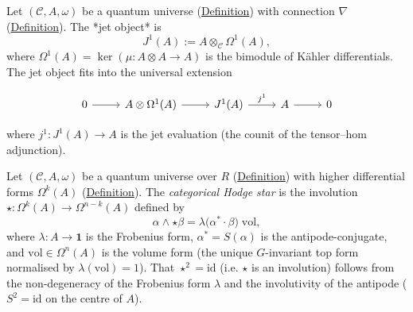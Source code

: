 \begin{definition}
  \label{def:categorical-jet}
Let $(\mathcal{C}, A, \omega)$ be a quantum universe
(\hyperref[def:quantum-universe]{Definition}) with connection $\nabla$
(\hyperref[def:categorical-connection]{Definition}). The *jet
object* is
\[
J^1(A) := A \otimes_{\mathcal{C}} \Omega^1(A),
\]
where $\Omega^1(A) = \ker(\mu \colon A \otimes A \to A)$ is the
bimodule of K\"ahler differentials. The jet object fits into the
universal extension

\begin{equation}\label{eq:jet-ses}
\begin{tikzcd}[column sep=2.5em]
  0 \ar[r]
  & A \otimes \Omega^1(A) \ar[r]
  & J^1(A) \ar[r, "j^1"]
  & A \ar[r]
  & 0
\end{tikzcd}
\end{equation}

where $j^1 \colon J^1(A) \to A$ is the jet evaluation (the counit of
the tensor--hom adjunction).
\end{definition}

\begin{definition}
  \label{def:categorical-hodge-star}
Let $(\mathcal{C}, A, \omega)$ be a quantum universe over $R$
(\hyperref[def:quantum-universe]{Definition}) with higher differential forms
$\Omega^k(A)$ (\hyperref[def:higher-forms]{Definition}). The
\emph{categorical Hodge star} is the involution
$\star \colon \Omega^k(A) \to \Omega^{n-k}(A)$ defined by
\[
\alpha \wedge \star \beta
  = \lambda\bigl(\alpha^* \cdot \beta\bigr)\;\mathrm{vol},
\]
where $\lambda \colon A \to \mathbf{1}$ is the Frobenius form,
$\alpha^* = S(\alpha)$ is the antipode-conjugate, and
$\mathrm{vol} \in \Omega^n(A)$ is the volume form
(the unique $G$-invariant top form normalised by
$\lambda(\mathrm{vol}) = 1$).
That $\star^2 = \mathrm{id}$ (i.e. $\star$ is an involution)
follows from the non-degeneracy of the Frobenius form $\lambda$ and the
involutivity of the antipode ($S^2 = \mathrm{id}$ on the centre
of $A$).
\end{definition}

